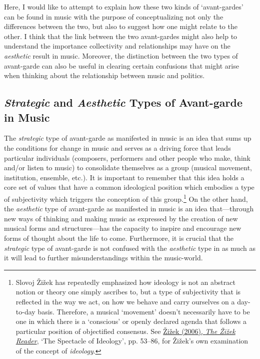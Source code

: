 Here, I would like to attempt to explain how these two kinds of `avant-gardes' can be found in music with the purpose of conceptualizing not only the differences between the two, but also to suggest how one might relate to the other. I think that the link between the two avant-gardes might also help to understand the importance collectivity and relationships may have on the \emph{aesthetic} result in music. Moreover, the distinction between the two types of avant-garde can also be useful in clearing certain confusions that might arise when thinking about the relationship between music and politics.  

\subsection*{\emph{Strategic} and \emph{Aesthetic} Types of Avant-garde in Music}

The \emph{strategic} type of avant-garde as manifested in music is an idea that sums up the conditions for change in music and serves as a driving force that leads particular individuals (composers, performers and other people who make, think and/or listen to music) to consolidate themselves as a group (musical movement, institution, ensemble, etc.). It is important to remember that this idea holds a core set of values that have a common ideological position which embodies a type of subjectivity which triggers the conception of this group.\footnote{Slovoj \v{Z}i\v{z}ek has repeatedly emphasized how ideology is not an abstract notion or theory one simply ascribes to, but a type of subjectivity that is reflected in the way we act, on how we behave and carry ourselves on a day-to-day basis. Therefore, a musical `movement' doesn't necessarily have to be one in which there is a `conscious' or openly declared agenda that follows a particular position of objectified consensus. See \hyperlink{zizekreader}{\v{Z}i\v{z}ek (2006), \emph{The \v{Z}i\v{z}ek Reader}}, `The Spectacle of Ideology', pp. 53--86, for \v{Z}i\v{z}ek's own examination of the concept of \emph{ideology}.} On the other hand,  the \emph{aesthetic} type of avant-garde as manifested in music is an idea that---through new ways of thinking and making music as expressed by the creation of new musical forms and structures---has the capacity to inspire and encourage new forms of thought about the life to come.  Furthermore, it is crucial that the \emph{strategic} type of avant-garde is not confused with the \emph{aesthetic} type in as much as it will lead to further misunderstandings within the music-world. 

